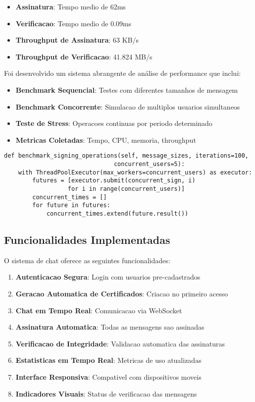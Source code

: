 \documentclass[12pt,a4paper,oneside]{article}
\begin{document}
\begin{itemize}
    \item \textbf{Assinatura}: Tempo medio de 62ms
    \item \textbf{Verificacao}: Tempo medio de 0.09ms
    \item \textbf{Throughput de Assinatura}: 63 KB/s
    \item \textbf{Throughput de Verificacao}: 41.824 MB/s
\end{itemize}

Foi desenvolvido um sistema abrangente de análise de performance que inclui:

\begin{itemize}
    \item \textbf{Benchmark Sequencial}: Testes com diferentes tamanhos de mensagem
    \item \textbf{Benchmark Concorrente}: Simulacao de multiplos usuarios simultaneos
    \item \textbf{Teste de Stress}: Operacoes continuas por periodo determinado
    \item \textbf{Metricas Coletadas}: Tempo, CPU, memoria, throughput
\end{itemize}

\begin{lstlisting}[caption=Benchmark de operações concorrentes]
def benchmark_signing_operations(self, message_sizes, iterations=100, 
                               concurrent_users=5):
    with ThreadPoolExecutor(max_workers=concurrent_users) as executor:
        futures = [executor.submit(concurrent_sign, i) 
                  for i in range(concurrent_users)]
        concurrent_times = []
        for future in futures:
            concurrent_times.extend(future.result())
\end{lstlisting}

\subsection{Funcionalidades Implementadas}

O sistema de chat oferece as seguintes funcionalidades:

\begin{enumerate}
    \item \textbf{Autenticacao Segura}: Login com usuarios pre-cadastrados
    \item \textbf{Geracao Automatica de Certificados}: Criacao no primeiro acesso
    \item \textbf{Chat em Tempo Real}: Comunicacao via WebSocket
    \item \textbf{Assinatura Automatica}: Todas as mensagens sao assinadas
    \item \textbf{Verificacao de Integridade}: Validacao automatica das assinaturas
    \item \textbf{Estatisticas em Tempo Real}: Metricas de uso atualizadas
    \item \textbf{Interface Responsiva}: Compativel com dispositivos moveis
    \item \textbf{Indicadores Visuais}: Status de verificacao das mensagens
\end{enumerate}
\end{document}
